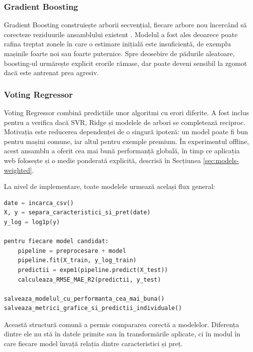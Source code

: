 \subsubsection{Gradient Boosting}

Gradient Boosting construiește arborii secvențial, fiecare arbore nou încercând să corecteze reziduurile ansamblului existent \cite{friedman2001greedy}. Modelul a fost ales deoarece poate rafina treptat zonele în care o estimare inițială este insuficientă, de exemplu mașinile foarte noi sau foarte puternice. Spre deosebire de pădurile aleatoare, boosting-ul urmărește explicit erorile rămase, dar poate deveni sensibil la zgomot dacă este antrenat prea agresiv.

\subsubsection{Voting Regressor}

Voting Regressor combină predicțiile unor algoritmi cu erori diferite. A fost inclus pentru a verifica dacă SVR, Ridge și modelele de arbori se completează reciproc. Motivația este reducerea dependenței de o singură ipoteză: un model poate fi bun pentru mașini comune, iar altul pentru exemple premium. În experimentul offline, acest ansamblu a oferit cea mai bună performanță globală, în timp ce aplicația web folosește și o medie ponderată explicită, descrisă în Secțiunea \ref{sec:models-weighted}.

La nivel de implementare, toate modelele urmează același flux general:

\begin{lstlisting}[language=Python,caption={Pseudocod pentru antrenarea modelelor},label={lst:model-training-pseudo}]
date = incarca_csv()
X, y = separa_caracteristici_si_pret(date)
y_log = log1p(y)

pentru fiecare model candidat:
    pipeline = preprocesare + model
    pipeline.fit(X_train, y_log_train)
    predictii = expm1(pipeline.predict(X_test))
    calculeaza_RMSE_MAE_R2(predictii, y_test)

salveaza_modelul_cu_performanta_cea_mai_buna()
salveaza_metrici_grafice_si_predictii_individuale()
\end{lstlisting}

Această structură comună a permis compararea corectă a modelelor. Diferența dintre ele nu stă în datele primite sau în transformările aplicate, ci în modul în care fiecare model învață relația dintre caracteristici și preț.


